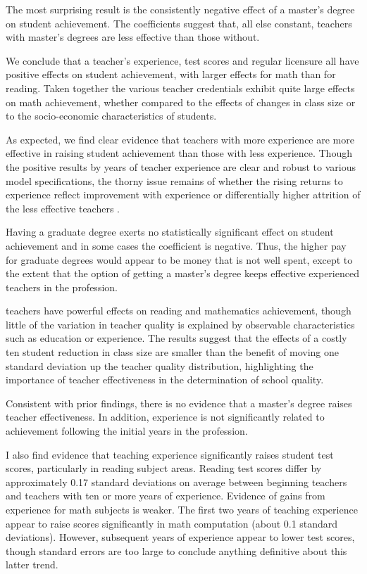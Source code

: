 The most surprising result is the consistently negative effect of a master’s degree on student achievement. The coefficients suggest that, all else constant, teachers with master’s degrees are less effective than those without. \citep{Clotfelter_et_al_2006}


We conclude that a teacher’s experience, test scores and regular licensure all have positive effects on student achievement, with larger effects for math than for reading. Taken together the various teacher credentials exhibit quite large effects on math achievement, whether compared to the effects of changes in class size or to the socio-economic characteristics of students. \citep{Clotfelter_et_al_2007}


As expected, we find clear evidence that teachers with more experience are more effective in raising student achievement than those with less experience. Though the positive results by years of teacher experience are clear and robust to various model specifications, the thorny issue remains of whether the rising returns to experience reflect improvement with experience or differentially higher attrition of the less effective teachers \citep{Rockoff_2004}. 


Having a graduate degree exerts no statistically significant effect on student achievement and in some cases the coefficient is negative. Thus, the higher pay for graduate degrees would appear to be money that is not well spent, except to the extent that the option of getting a master’s degree keeps effective experienced teachers in the profession. \citep{Clotfelter_et_al_2007}


teachers have powerful effects on reading and mathematics achievement, though little of the variation in teacher quality is explained by observable characteristics such as education or experience. The results suggest that the effects of a costly ten student reduction in class size are smaller than the benefit of moving one standard deviation up the teacher quality
distribution, highlighting the importance of teacher effectiveness in the determination of school quality. \citep{Rivkin_et_al_2005}

Consistent with prior findings, there is no evidence that a master’s degree raises teacher effectiveness. In addition, experience is not significantly related to achievement following the initial years in the profession. \citep{Rivkin_et_al_2005}

I also find evidence that teaching experience significantly raises student test scores, particularly in reading subject areas. Reading test scores differ by approximately 0.17 standard deviations on average between beginning teachers and teachers with ten or more years of experience. Evidence of gains from experience for math subjects is weaker. The first two years of teaching experience appear to raise scores significantly in math computation (about 0.1 standard deviations). However, subsequent years of experience appear to lower test scores, though standard errors are too large to conclude anything definitive about this latter trend. \citep{Rockoff_2004}



